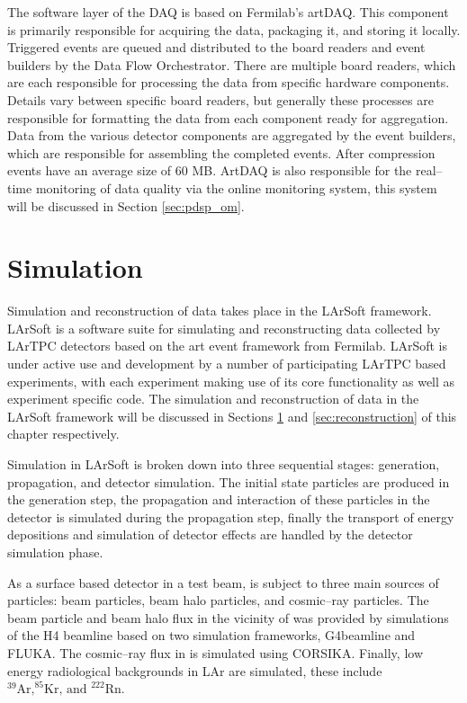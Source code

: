 The software layer of the \protodune{} DAQ is based on Fermilab's 
artDAQ\cite{6495515}. This component is primarily responsible for acquiring 
the data, packaging it, and storing it locally. Triggered events are queued 
and distributed to the board readers and event builders by the Data Flow 
Orchestrator. There are multiple board readers, which are each responsible for 
processing the data from specific hardware components. Details vary between 
specific board readers, but generally these processes are responsible for 
formatting the data from each component ready for aggregation. Data from the 
various detector components are aggregated by the event builders, which are 
responsible for assembling the completed events. After compression events have 
an average size of 60 MB. ArtDAQ is also responsible for the real--time 
monitoring of data quality via the online monitoring system, this system will 
be discussed in Section \ref{sec:pdsp_om}.

\section{Simulation} \label{sec:simulation}

Simulation and reconstruction of \protodune{} data takes place in the LArSoft
framework\cite{Snider2017}. LArSoft is a software suite for simulating and
reconstructing data collected by LArTPC detectors based on the art event 
framework from Fermilab\cite{Green:2012gv}. LArSoft is under active use and
development by a number of participating LArTPC based experiments, with each
experiment making use of its core functionality as well as experiment specific
code. The simulation and reconstruction of \protodune{} data in the LArSoft
framework will be discussed in Sections \ref{sec:simulation} and
\ref{sec:reconstruction} of this chapter respectively.

Simulation in LArSoft is broken down into three sequential stages: generation,
propagation, and detector simulation. The initial state particles are produced
in the generation step, the propagation and interaction of these particles in
the detector is simulated during the propagation step, finally the transport of 
energy depositions and simulation of detector effects are handled by the
detector simulation phase.

As a surface based detector in a test beam, \protodune{} is subject to three
main sources of particles: beam particles, beam halo particles, and cosmic--ray
particles. The beam particle and beam halo flux in the vicinity of 
\protodune{} was provided by simulations of the H4 
beamline\cite{Booth:2019brj} based on two simulation frameworks, 
G4beamline\cite{g4beamline} and FLUKA\cite{BOHLEN2014211}. The cosmic--ray 
flux in \protodune{} is simulated using CORSIKA\cite{Heck:1998vt}. Finally, 
low energy radiological backgrounds in LAr are simulated, these include 
$^{39}\mbox{Ar,} ^ {85}\mbox{Kr, and } ^{222}\mbox{Rn}$.

